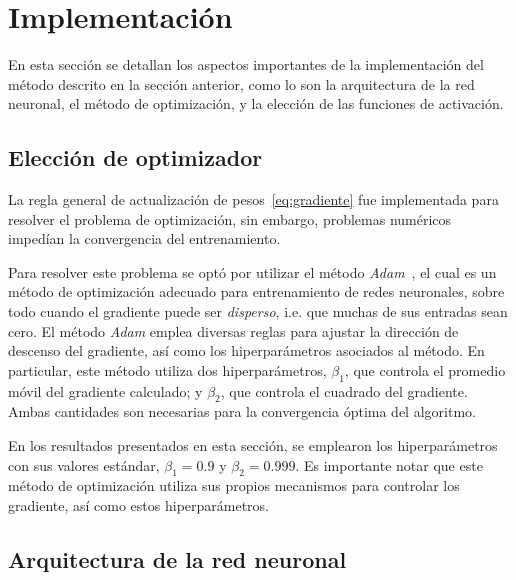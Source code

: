 \section{Implementación}
En esta sección se detallan los aspectos importantes de la implementación del método
descrito en la sección anterior, como lo son la arquitectura de la red neuronal, el método
de optimización, y la elección de las funciones de activación.

\subsection{Elección de optimizador}
La regla general de actualización de pesos~\eqref{eq:gradiente} fue implementada para 
resolver el problema de optimización, sin embargo, problemas numéricos impedían la
convergencia del entrenamiento.

Para resolver este problema se optó por utilizar el método \emph{Adam}~\cite{kingmaAdamMethodStochastic2017},
el cual es un método de optimización adecuado para entrenamiento de redes neuronales,
sobre todo cuando el gradiente puede ser \emph{disperso}, i.e. que muchas de sus entradas
sean cero.
El método \emph{Adam} emplea diversas reglas para ajustar la dirección de descenso del
gradiente, así como los hiperparámetros asociados al método. En particular, este método
utiliza dos hiperparámetros, $\beta_1$, que controla el promedio móvil
del gradiente calculado; y $\beta_2$, que controla el cuadrado del gradiente. Ambas
cantidades son necesarias para la convergencia óptima del algoritmo.

En los resultados presentados en esta sección, se emplearon los hiperparámetros con sus
valores estándar, $\beta_1=0.9$ y $\beta_2=0.999$. Es importante notar que este método
de optimización utiliza sus propios mecanismos para controlar los gradiente, así como
estos hiperparámetros.

\subsection{Arquitectura de la red neuronal}

